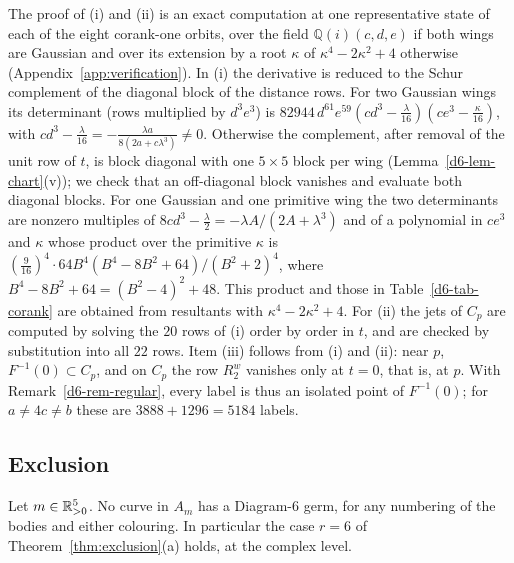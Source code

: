 The proof of (i) and (ii) is an exact computation at one representative state of each of the
eight corank-one orbits, over the field $\mathbb Q(i)(c,d,e)$ if both wings are Gaussian and over
its extension by a root $\kappa$ of $\kappa^4-2\kappa^2+4$ otherwise
(Appendix~\ref{app:verification}).  In (i) the derivative is reduced to the Schur complement of
the diagonal block of the distance rows.  For two Gaussian wings its determinant (rows multiplied
by $d^3e^3$) is $82944\,d^{61}e^{59}(cd^3-\frac{\lambda}{16})(ce^3-\frac{\kappa}{16})$, with
$cd^3-\frac{\lambda}{16}=-\frac{\lambda a}{8(2a+c\lambda^3)}\ne0$.  Otherwise the complement, after
removal of the unit row of $t$, is block diagonal with one $5\times5$ block per wing
(Lemma~\ref{d6-lem-chart}(v)); we check that an off-diagonal block vanishes and evaluate both
diagonal blocks.  For one Gaussian and one primitive wing the two determinants are nonzero
multiples of $8cd^3-\frac{\lambda}{2}=-\lambda A/(2A+\lambda^3)$ and of a polynomial in $ce^3$ and
$\kappa$ whose product over the primitive $\kappa$ is
$(\frac9{16})^4\cdot64B^4(B^4-8B^2+64)/(B^2+2)^4$, where $B^4-8B^2+64=(B^2-4)^2+48$.  This
product and those in Table~\ref{d6-tab-corank} are obtained from resultants with
$\kappa^4-2\kappa^2+4$.  For (ii) the jets of $C_p$ are computed by solving the $20$ rows of (i)
order by order in $t$, and are checked by substitution into all $22$ rows.  Item (iii) follows
from (i) and (ii): near $p$, $F^{-1}(0)\subset C_p$, and on $C_p$ the row $R^w_2$ vanishes only at
$t=0$, that is, at $p$.  With Remark~\ref{d6-rem-regular}, every label is thus an isolated point
of $F^{-1}(0)$; for $a\ne4c\ne b$ these are $3888+1296=5184$ labels.

\subsection{Exclusion}

\begin{theorem}\label{thm:d6}
Let $m\in\mathbb{R}_{>0}^5$.  No curve in $A_m$ has a Diagram-6 germ, for any numbering of the bodies and
either colouring.  In particular the case $r=6$ of Theorem~\ref{thm:exclusion}(a) holds, at the
complex level.
\end{theorem}

